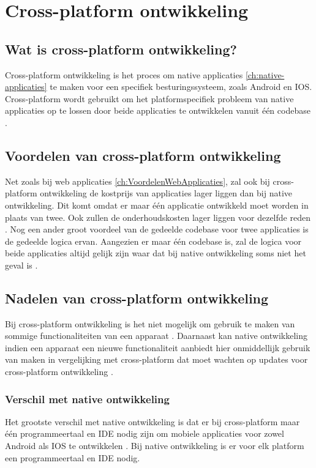 \section{Cross-platform ontwikkeling}
\subsection{Wat is cross-platform ontwikkeling?}
Cross-platform ontwikkeling is het proces om native applicaties \ref{ch:native-applicaties} 
te maken voor een specifiek besturingssysteem, zoals Android en IOS. Cross-platform wordt 
gebruikt om het platformspecifiek probleem van native applicaties op te lossen door beide 
applicaties te ontwikkelen vanuit één codebase \autocite{Khan2021}.

\subsection{Voordelen van cross-platform ontwikkeling}
Net zoals bij web applicaties \ref{ch:VoordelenWebApplicaties}, zal ook bij cross-platform 
ontwikkeling de kostprijs van applicaties lager liggen dan bij native ontwikkeling. 
Dit komt omdat er maar één applicatie ontwikkeld moet worden in plaats van twee. Ook zullen de 
onderhoudskosten lager liggen voor dezelfde reden \autocite{Terekhov2022}. Nog een ander 
groot voordeel van de gedeelde codebase voor twee applicaties is de gedeelde logica ervan. 
Aangezien er maar één codebase is, zal de logica voor beide applicaties altijd gelijk zijn waar 
dat bij native ontwikkeling soms niet het geval is \autocite{Kotlin2023}.

\subsection{Nadelen van cross-platform ontwikkeling}
Bij cross-platform ontwikkeling is het niet mogelijk om gebruik te maken van sommige 
functionaliteiten van een apparaat \autocite{Terekhov2022}. Daarnaast kan native 
ontwikkeling indien een apparaat een nieuwe functionaliteit aanbiedt hier onmiddellijk gebruik 
van maken in vergelijking met cross-platform dat moet wachten op updates voor cross-platform 
ontwikkeling \autocite{Sakovich22023}.

\subsubsection{Verschil met native ontwikkeling}
Het grootste verschil met native ontwikkeling is dat er bij cross-platform maar één 
programmeertaal en IDE nodig zijn om mobiele applicaties voor zowel Android als IOS te 
ontwikkelen \autocite{Hu2021}. Bij native ontwikkeling is er voor elk platform een 
programmeertaal en IDE nodig. 

